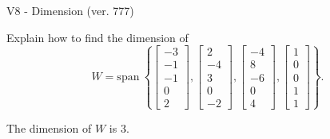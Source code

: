 \begin{exercise}
  \begin{exerciseTitle}V8 - Dimension (ver. 777)\end{exerciseTitle}
  \begin{exerciseStatement}
    Explain how to find the dimension of 
\[W=\mathrm{span}\ \left\{\left[\begin{array}{r}
-3 \\
-1 \\
-1 \\
0 \\
2
\end{array}\right] , \left[\begin{array}{r}
2 \\
-4 \\
3 \\
0 \\
-2
\end{array}\right] , \left[\begin{array}{r}
-4 \\
8 \\
-6 \\
0 \\
4
\end{array}\right] , \left[\begin{array}{r}
1 \\
0 \\
0 \\
1 \\
1
\end{array}\right]\right\}.\]



  \end{exerciseStatement}
  \begin{exerciseAnswer}
   The dimension of \(W\) is  \(3\).
  


  \end{exerciseAnswer}
\end{exercise}